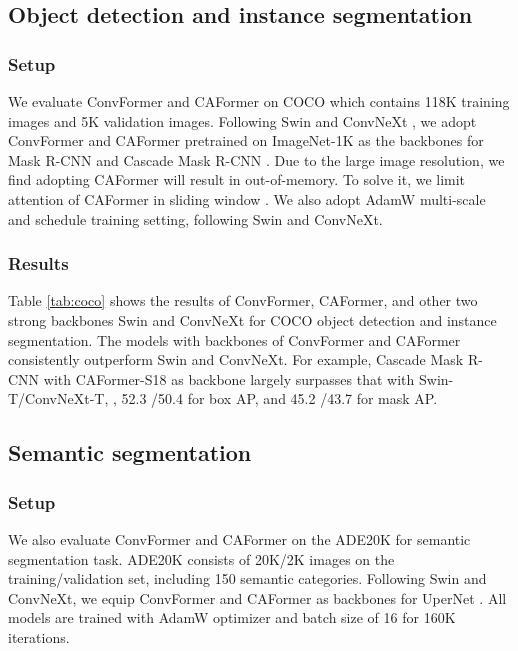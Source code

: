 \subsection{Object detection and instance segmentation}
\subsubsection{Setup}

We evaluate ConvFormer and CAFormer on COCO \cite{coco} which contains 118K training images and 5K validation images. Following Swin \cite{swin} and ConvNeXt \cite{convnext}, we adopt ConvFormer and CAFormer pretrained on ImageNet-1K as the backbones for Mask R-CNN \cite{he2017mask} and Cascade Mask R-CNN \cite{cai2018cascade}.  Due to the large image resolution, we find adopting CAFormer will result in out-of-memory. To solve it, we limit attention of CAFormer in sliding window \cite{beltagy2020longformer, hassani2023neighborhood}. We also adopt AdamW multi-scale and  schedule training setting, following Swin and ConvNeXt.


\subsubsection{Results}

Table \ref{tab:coco} shows the results of ConvFormer, CAFormer, and other two strong backbones Swin and ConvNeXt for COCO object detection and instance segmentation. The models with backbones of ConvFormer and CAFormer consistently outperform Swin and ConvNeXt. For example, Cascade Mask R-CNN with CAFormer-S18 as backbone largely surpasses that with Swin-T/ConvNeXt-T, \ie, 52.3 /50.4 for box AP, and 45.2 /43.7 for mask AP.

\subsection{Semantic segmentation}
\subsubsection{Setup}

We also evaluate ConvFormer and CAFormer on the ADE20K \cite{ade20k} for semantic segmentation task. ADE20K consists of 20K/2K images on the training/validation set, including 150 semantic categories. Following Swin and ConvNeXt, we equip ConvFormer and CAFormer as backbones for UperNet \cite{upernet}. All models are trained with AdamW optimizer \cite{kingma2014adam, loshchilov2017decoupled} and batch size of 16 for 160K iterations. 


